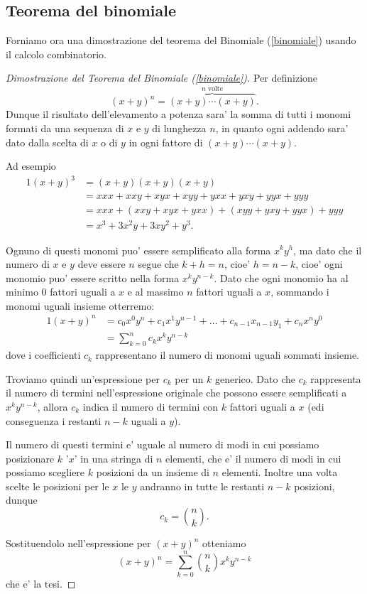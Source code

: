 \subsection{Teorema del binomiale}
Forniamo ora una dimostrazione del teorema del Binomiale (\ref{binomiale}) usando il calcolo combinatorio.
\begin{proof}[Dimostrazione del Teorema del Binomiale (\ref{binomiale})]
    Per definizione \[
        (x + y)^n = \overbrace{(x+y)\cdots (x+y)}^{n \text{ volte}}.
    \] Dunque il risultato dell'elevamento a potenza sara' la somma di tutti i monomi formati da una sequenza di $x$ e $y$ di lunghezza $n$, in quanto ogni addendo sara' dato dalla scelta di $x$ o di $y$ in ogni fattore di $(x+y)\cdots (x+y)$.

    Ad esempio \begin{alignat*}{1}
        (x+y)^3 &= (x+y)(x+y)(x+y) \\
                &= xxx + xxy + xyx + xyy + yxx + yxy + yyx + yyy\\
                &= xxx + (xxy + xyx + yxx) + (xyy + yxy + yyx) + yyy\\
                &= x^3 + 3x^2y + 3xy^2 + y^3.
    \end{alignat*}

    Ognuno di questi monomi puo' essere semplificato alla forma $x^ky^h$, ma dato che il numero di $x$ e $y$ deve essere $n$ segue che $k + h = n$, cioe' $h = n - k$, cioe' ogni monomio puo' essere scritto nella forma $x^ky^{n-k}$. Dato che ogni monomio ha al minimo 0 fattori uguali a $x$ e al massimo $n$ fattori uguali a $x$, sommando i monomi uguali insieme otterremo:
    \begin{alignat*}
        {1}
        (x+y)^n &= c_0x^0y^n + c_1x^1y^{n-1} + \dots + c_{n-1}x_{n-1}y_1 + c_nx^ny^0\\
        &= \sum_{k = 0}^n c_kx^ky^{n-k}
    \end{alignat*}
    dove i coefficienti $c_k$ rappresentano il numero di monomi uguali sommati insieme.

    Troviamo quindi un'espressione per $c_k$ per un $k$ generico. Dato che $c_k$ rappresenta il numero di termini nell'espressione originale che possono essere semplificati a $x^ky^{n-k}$, allora $c_k$ indica il numero di termini con $k$ fattori uguali a $x$ (edi conseguenza i restanti $n-k$ uguali a $y$). 
    
    Il numero di questi termini e' uguale al numero di modi in cui possiamo posizionare $k$ '$x$' in una stringa di $n$ elementi, che e' il numero di modi in cui possiamo scegliere $k$ posizioni da un insieme di $n$ elementi. Inoltre una volta scelte le posizioni per le $x$ le $y$ andranno in tutte le restanti $n-k$ posizioni, dunque \[
        c_k = \binom{n}{k}.
    \]

    Sostituendolo nell'espressione per $(x+y)^n$ otteniamo \[
        (x+y)^n = \sum_{k = 0}^n \binom{n}{k}x^ky^{n-k}
    \] che e' la tesi.
\end{proof}

